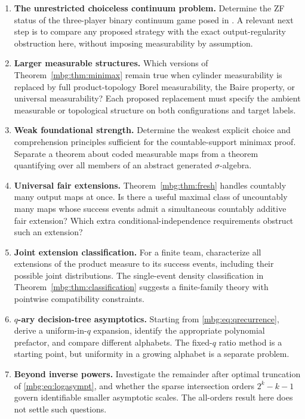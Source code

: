 \documentclass[11pt,letterpaper]{article}
\theoremstyle{definition}
\begin{document}
\begin{enumerate}[label=\textbf{Q\arabic*.},leftmargin=2.7em,itemsep=0.65em]
\item \textbf{The unrestricted choiceless continuum problem.}
Determine the ZF status of the three-player binary continuum game posed in \cite{GlazerBox}. A relevant next step is to compare any proposed strategy with the exact output-regularity obstruction here, without imposing measurability by assumption.

\item \textbf{Larger measurable structures.}
Which versions of Theorem~\ref{mbg:thm:minimax} remain true when cylinder measurability is replaced by full product-topology Borel measurability, the Baire property, or universal measurability? Each proposed replacement must specify the ambient measurable or topological structure on both configurations and target labels.

\item \textbf{Weak foundational strength.}
Determine the weakest explicit choice and comprehension principles sufficient for the countable-support minimax proof. Separate a theorem about coded measurable maps from a theorem quantifying over all members of an abstract generated $\sigma$-algebra.

\item \textbf{Universal fair extensions.}
Theorem~\ref{mbg:thm:fresh} handles countably many output maps at once. Is there a useful maximal class of uncountably many maps whose success events admit a simultaneous countably additive fair extension? Which extra conditional-independence requirements obstruct such an extension?

\item \textbf{Joint extension classification.}
For a finite team, characterize all extensions of the product measure to its success events, including their possible joint distributions. The single-event density classification in Theorem~\ref{mbg:thm:classification} suggests a finite-family theory with pointwise compatibility constraints.

\item \textbf{$q$-ary decision-tree asymptotics.}
Starting from \eqref{mbg:eq:qrecurrence}, derive a uniform-in-$q$ expansion, identify the appropriate polynomial prefactor, and compare different alphabets. The fixed-$q$ ratio method is a starting point, but uniformity in a growing alphabet is a separate problem.

\item \textbf{Beyond inverse powers.}
Investigate the remainder after optimal truncation of \eqref{mbg:eq:logasympt}, and whether the sparse intersection orders $2^k-k-1$ govern identifiable smaller asymptotic scales. The all-orders result here does not settle such questions.


\end{enumerate}
\end{document}
